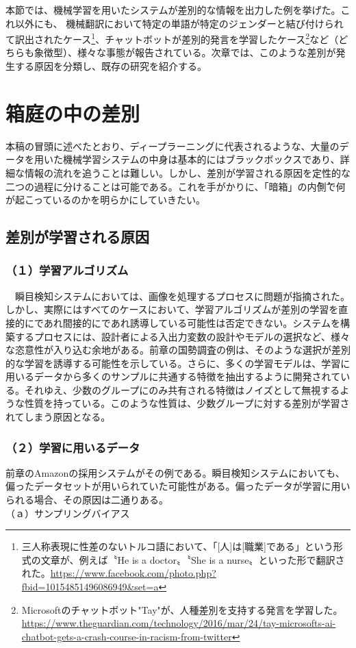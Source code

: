 \documentclass[b5j,twoside,twocolumn]{utarticle}
\newcommand{\mysection}[1]{\vspace{-5mm}\section{#1}\vspace{-2mm}}
\newcommand{\mysubsection}[1]{\vspace{-6mm}\subsection{#1}\vspace{-2mm}}
\begin{document}
本節では、機械学習を用いたシステムが差別的な情報を出力した例を挙げた。これ以外にも、
機械翻訳において特定の単語が特定のジェンダーと結び付けられて訳出されたケース\footnote{三人称表現に性差のないトルコ語において、「[人]は[職業]である」という形式の文章が、例えば〝He is a doctor〟〝She is a nurse〟といった形で翻訳された。\url{https://www.facebook.com/photo.php?fbid=10154851496086949&set=a}}、チャットボットが差別的発言を学習したケース\footnote{Microsoftのチャットボット"Tay"が、人種差別を支持する発言を学習した。\\\url{https://www.theguardian.com/technology/2016/mar/24/tay-microsofts-ai-chatbot-gets-a-crash-course-in-racism-from-twitter}}など（どちらも象徴型）、様々な事態が報告されている。次章では、このような差別が発生する原因を分類し、既存の研究を紹介する。
\mysection{箱庭の中の差別}
本稿の冒頭に述べたとおり、ディープラーニングに代表されるような、大量のデータを用いた機械学習システムの中身は基本的にはブラックボックスであり、詳細な情報の流れを追うことは難しい。しかし、差別が学習される原因を定性的な二つの過程に分けることは可能である。これを手がかりに、「暗箱」の\.内\.側で何が起こっているのかを明らかにしていきたい。
\mysubsection{差別が学習される原因}
\subsubsection*{（１）学習アルゴリズム}
\vspace{-3mm}
~~瞬目検知システムにおいては、画像を処理するプロセスに問題が指摘された。
しかし、実際にはすべてのケースにおいて、学習アルゴリズムが差別の学習を直接的にであれ間接的にであれ誘導している可能性は否定できない。システムを構築するプロセスには、設計者による入出力変数の設計やモデルの選択など、様々な恣意性が入り込む余地がある。前章の国勢調査の例は、そのような選択が差別的な学習を誘導する可能性を示している。さらに、多くの学習モデルは、学習に用いるデータから多くのサンプルに共通する特徴を抽出するように開発されている。それゆえ、少数のグループにのみ共有される特徴はノイズとして無視するような性質を持っている。このような性質は、少数グループに対する差別が学習されてしまう原因となる。


\subsubsection*{（２）学習に用いるデータ}
\vspace{-3mm}
前章のAmazonの採用システムがその例である。瞬目検知システムにおいても、偏ったデータセットが用いられていた可能性がある。偏ったデータが学習に用いられる場合、その原因は二通りある。\\
（ａ）サンプリングバイアス
\end{document}
